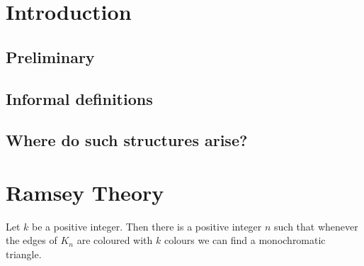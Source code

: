 \documentclass{article}
\begin{document}
\maketitle



\clearpage
\section{Introduction}
\subsection{Preliminary}

\subsection{Informal definitions}



\subsection{Where do such structures arise?}

\clearpage
\section{Ramsey Theory}





















































\begin{nprop}\label{prop:1}
    Let $k$ be a positive integer.
    Then there is a positive integer $n$ such that whenever the edges of $K_n$ are coloured with $k$ colours we can find a monochromatic triangle.
\end{nprop}
\end{document}
